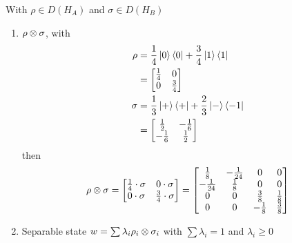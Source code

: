 \begin{example}
    With $\rho\in D(H_A)$ and $\sigma \in D(H_B)$
    \begin{enumerate}
        \item $\rho \otimes \sigma$, with
              \begin{align*}
                  \rho   & = \frac{1}{4}\left|0\right\rangle\left\langle 0\right| + \frac{3}{4}\left|1\right\rangle\left\langle 1\right|  \\
                         & =\begin{bmatrix}\frac{1}{4} & 0\\0 & \frac{3}{4}\end{bmatrix}                              \\
                  \sigma & = \frac{1}{3}\left|+\right\rangle\left\langle +\right| + \frac{2}{3}\left|-\right\rangle\left\langle -1\right| \\
                         & = \begin{bmatrix}\frac{1}{2} & -\frac{1}{6}\\-\frac{1}{6} & \frac{1}{2}\end{bmatrix}
              \end{align*}
              then
              \[\rho \otimes \sigma = \begin{bmatrix}\frac{1}{4}\cdot\sigma & 0\cdot \sigma\\0\cdot\sigma&\frac{3}{4}\cdot\sigma\end{bmatrix} = \begin{bmatrix}\frac{1}{8} & -\frac{1}{24} & 0 & 0\\-\frac{1}{24} & \frac{1}{8} & 0 & 0\\0 & 0 & \frac{3}{8} & \frac{1}{8}\\0 & 0 & -\frac{1}{8} & \frac{3}{8}\end{bmatrix}\]
        \item Separable state $w = \sum \lambda_i \rho_i \otimes \sigma_i$ with $\sum \lambda_i = 1$ and $\lambda_i \geq 0$
    \end{enumerate}
\end{example}